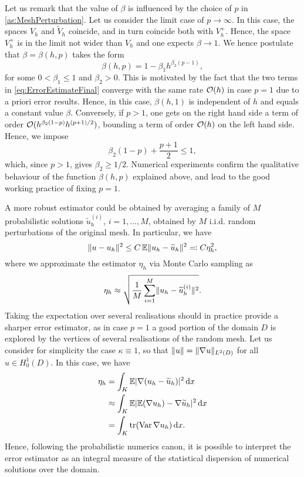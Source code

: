 \begin{remark} Let us remark that the value of $\beta$ is influenced by the choice of $p$ in \cref{as:MeshPerturbation}. Let us consider the limit case of $p \to \infty$. In this case, the spaces $V_h$ and $\tilde V_h$ coincide, and in turn coincide both with $V_h^+$. Hence, the space $V_h^+$ is in the limit not wider than $V_h$ and one expects $\beta \to 1$. We hence postulate that $\beta = \beta(h, p)$ takes the form
	\begin{equation}
		\beta(h, p) = 1 - \beta_1 h^{\beta_2(p-1)},
	\end{equation}
	for some $0 < \beta_1 \leq 1$ and $\beta_2 > 0$. This is motivated by the fact that the two terms in \eqref{eq:ErrorEstimateFinal} converge with the same rate $\mathcal{O}(h)$ in case $p = 1$ due to a priori error results. Hence, in this case, $\beta(h, 1)$ is independent of $h$ and equals a constant value $\beta$. Conversely, if $p > 1$, one gets on the right hand side a term of order $\mathcal{O}(h^{\beta_2(1-p)} h^{(p+1)/2})$, bounding a term of order $\mathcal{O}(h)$ on the left hand side. Hence, we impose
	\begin{equation}
		\beta_2(1-p) + \frac{p+1}{2} \leq 1,
	\end{equation}
	which, since $p > 1$, gives $\beta_2 \geq 1/2$. Numerical experiments confirm the qualitative behaviour of the function $\beta(h, p)$ explained above, and lead to the good working practice of fixing $p = 1$.
\end{remark}

A more robust estimator could be obtained by averaging a family of $M$ probabilistic solutions $\widetilde u_h^{(i)}$, $i = 1, \ldots, M$, obtained by $M$ i.i.d. random perturbations of the original mesh. In particular, we have 
\begin{equation}
	\lVert u - u_h\rVert^2 \leq C \operatorname{\mathbb{E}} \lVert u_h - \widetilde u_h\rVert^2 \eqqcolon C \eta_h^2,
\end{equation}
where we approximate the estimator $\eta_h$ via Monte Carlo sampling as
\begin{equation}
	\eta_h \approx \sqrt{\frac{1}{M} \sum_{i=1}^M \lVert u_h - \widetilde u_h^{(i)}\rVert^2}.
\end{equation}
Taking the expectation over several realisations should in practice provide a sharper error estimator, as in case $p = 1$ a good portion of the domain $D$ is explored by the vertices of several realisations of the random mesh. Let us consider for simplicity the case $\kappa \equiv 1$, so that $\lVert u\rVert = \lVert\nabla u\rVert_{L^2(D)}$ for all $u \in H^1_0(D)$. In this case, we have
\begin{equation}
\begin{aligned}
	\eta_h &= \int_{K} \operatorname{\mathbb{E}} \lvert\nabla (u_h - \widetilde u_h)\rvert^2 \,\mathrm{d} x\\
		   &\approx \int_{K} \operatorname{\mathbb{E}} \lvert\operatorname{\mathbb{E}} (\nabla u_h) - \nabla \widetilde u_h\rvert^2 \,\mathrm{d} x\\
		   &= \int_K \operatorname{tr} (\operatorname{Var} \nabla u_h) \,\mathrm{d} x.
\end{aligned}
\end{equation}   
Hence, following the probabilistic numerics canon, it is possible to interpret the error estimator as an integral measure of the statistical dispersion of numerical solutions over the domain.

